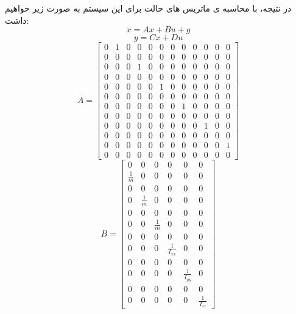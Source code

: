 در نتیجه، با محاسبه ی ماتریس های حالت برای این سیستم به صورت زیر خواهیم داشت:
\begin{equation}
	\dot{x} = A x + B u + g
\end{equation}
\begin{equation}
	y = C x + D u
\end{equation}
\begin{equation}
	A =
	\begin{bmatrix}
		0 & 1 & 0 & 0 & 0 & 0 & 0 & 0 & 0 & 0 & 0 & 0 \\
		0 & 0 & 0 & 0 & 0 & 0 & 0 & 0 & 0 & 0 & 0 & 0 \\
		0 & 0 & 0 & 1 & 0 & 0 & 0 & 0 & 0 & 0 & 0 & 0 \\
		0 & 0 & 0 & 0 & 0 & 0 & 0 & 0 & 0 & 0 & 0 & 0 \\
		0 & 0 & 0 & 0 & 0 & 1 & 0 & 0 & 0 & 0 & 0 & 0 \\
		0 & 0 & 0 & 0 & 0 & 0 & 0 & 0 & 0 & 0 & 0 & 0 \\
		0 & 0 & 0 & 0 & 0 & 0 & 0 & 1 & 0 & 0 & 0 & 0 \\
		0 & 0 & 0 & 0 & 0 & 0 & 0 & 0 & 0 & 0 & 0 & 0 \\
		0 & 0 & 0 & 0 & 0 & 0 & 0 & 0 & 0 & 1 & 0 & 0 \\
		0 & 0 & 0 & 0 & 0 & 0 & 0 & 0 & 0 & 0 & 0 & 0 \\
		0 & 0 & 0 & 0 & 0 & 0 & 0 & 0 & 0 & 0 & 0 & 1 \\
		0 & 0 & 0 & 0 & 0 & 0 & 0 & 0 & 0 & 0 & 0 & 0
	\end{bmatrix}
\end{equation}
\begin{equation}
	B =
	\begin{bmatrix}
		0 & 0 & 0 & 0 & 0 & 0 \\
		\frac{1}{m} & 0 & 0 & 0 & 0 & 0 \\
		0 & 0 & 0 & 0 & 0 & 0 \\
		0 & \frac{1}{m} & 0 & 0 & 0 & 0 \\
		0 & 0 & 0 & 0 & 0 & 0 \\
		0 & 0 & \frac{1}{m} & 0 & 0 & 0 \\
		0 & 0 & 0 & 0 & 0 & 0 \\
		0 & 0 & 0 & \frac{1}{I_{xx}} & 0 & 0 \\
		0 & 0 & 0 & 0 & 0 & 0 \\
		0 & 0 & 0 & 0 & \frac{1}{I_{yy}} & 0 \\
		0 & 0 & 0 & 0 & 0 & 0 \\
		0 & 0 & 0 & 0 & 0 & \frac{1}{I_{zz}}
	\end{bmatrix}
\end{equation}
